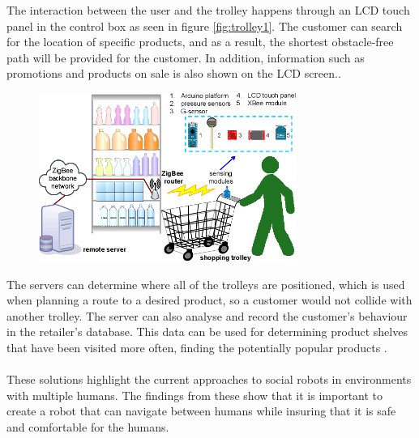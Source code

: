 The interaction between the user and the trolley happens through an LCD touch panel in the control box as seen in figure \ref{fig:trolley1}. The customer can search for the location of specific products, and as a result, the shortest obstacle-free path will be provided for the customer. In addition, information such as promotions and products on sale is also shown on the LCD screen.\cite{wangintelligent}.

\begin{figure}[H]
    \centering
    \includegraphics[width=0.75\textwidth]{figures/trolley.png}
\end{figure}

The servers can determine where all of the trolleys are positioned, which is used when planning a route to a desired product, so a customer would not collide with another trolley. The server can also analyse and record the customer's behaviour in the retailer's database. This data can be used for determining product shelves that have been visited more often, finding the potentially popular products \cite{wangintelligent}.
\\
\\
These solutions highlight the current approaches to social robots in environments with multiple humans. The findings from these show that it is important to create a robot that can navigate between humans while insuring that it is safe and comfortable for the humans.